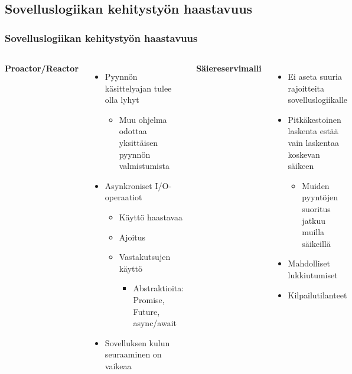 \documentclass{beamer}
\begin{document}
\subsection{Sovelluslogiikan kehitystyön haastavuus}
\begin{frame}
    \frametitle{Sovelluslogiikan kehitystyön haastavuus}
    \begin{columns}
        \textbf{Proactor/Reactor}
            \begin{itemize}
                \item Pyynnön käsittelyajan tulee olla lyhyt
                    \begin{itemize}
                        \item Muu ohjelma odottaa yksittäisen pyynnön valmistumista
                    \end{itemize}
                \item Asynkroniset I/O-operaatiot
                    \begin{itemize}
                        \item Käyttö haastavaa
                        \item Ajoitus
                        \item Vastakutsujen käyttö
                            \begin{itemize}
                                \item Abstraktioita: Promise, Future, async/await
                            \end{itemize}
                    \end{itemize}
                \item Sovelluksen kulun seuraaminen on vaikeaa
            \end{itemize}
        \textbf{Säiereservimalli}
            \begin{itemize}
                \item Ei aseta suuria rajoitteita sovelluslogiikalle
                \item Pitkäkestoinen laskenta estää vain laskentaa koskevan säikeen
                    \begin{itemize}
                        \item Muiden pyyntöjen suoritus jatkuu muilla säikeillä
                    \end{itemize}
                \item Mahdolliset lukkiutumiset
                \item Kilpailutilanteet
            \end{itemize}
    \end{columns}
\end{frame}
\end{document}
